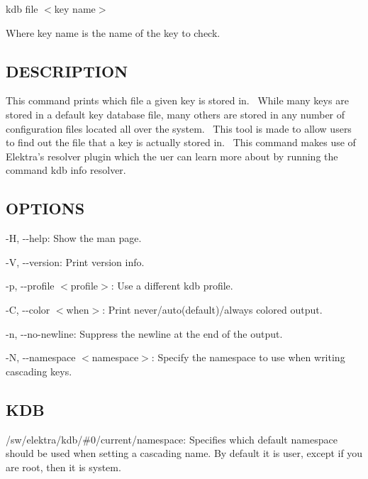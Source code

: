 {\ttfamily kdb file $<$key name$>$}~\newline


Where {\ttfamily key name} is the name of the key to check.~\newline


\subsection*{D\+E\+S\+C\+R\+I\+P\+T\+I\+ON}

This command prints which file a given key is stored in.~\newline
 While many keys are stored in a default key database file, many others are stored in any number of configuration files located all over the system.~\newline
 This tool is made to allow users to find out the file that a key is actually stored in.~\newline
 This command makes use of Elektra’s {\ttfamily resolver} plugin which the uer can learn more about by running the command {\ttfamily kdb info resolver}.

\subsection*{O\+P\+T\+I\+O\+NS}


\begin{DoxyItemize}
\item {\ttfamily -\/H}, {\ttfamily -\/-\/help}\+: Show the man page.
\item {\ttfamily -\/V}, {\ttfamily -\/-\/version}\+: Print version info.
\item {\ttfamily -\/p}, {\ttfamily -\/-\/profile $<$profile$>$}\+: Use a different kdb profile.
\item {\ttfamily -\/C}, {\ttfamily -\/-\/color $<$when$>$}\+: Print never/auto(default)/always colored output.
\item {\ttfamily -\/n}, {\ttfamily -\/-\/no-\/newline}\+: Suppress the newline at the end of the output.
\item {\ttfamily -\/N}, {\ttfamily -\/-\/namespace $<$namespace$>$}\+: Specify the namespace to use when writing cascading keys.
\end{DoxyItemize}

\subsection*{K\+DB}


\begin{DoxyItemize}
\item {\ttfamily /sw/elektra/kdb/\#0/current/namespace}\+: Specifies which default namespace should be used when setting a cascading name. By default it is {\ttfamily user}, except if you are root, then it is {\ttfamily system}.
\end{DoxyItemize}

